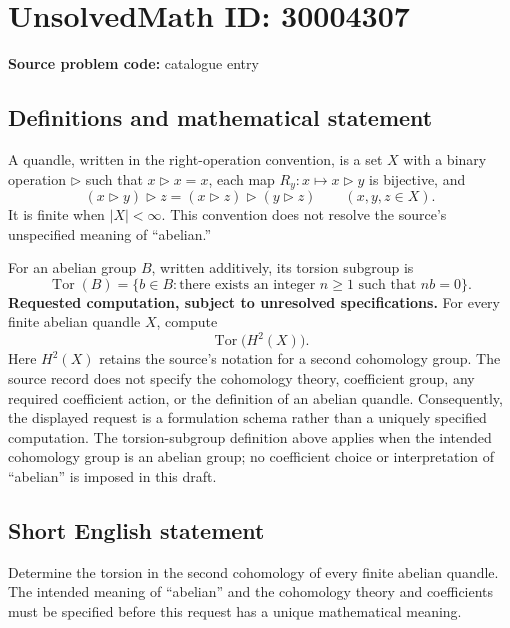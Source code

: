 \documentclass[11pt]{article}
\begin{document}
\section*{UnsolvedMath ID: 30004307}
\textbf{Source problem code:} catalogue entry
\subsection{Definitions and mathematical statement}
A quandle, written in the right-operation convention, is a set \(X\) with a binary operation \(\triangleright\) such that \(x\triangleright x=x\), each map \(R_y\colon x\mapsto x\triangleright y\) is bijective, and
\[
(x\triangleright y)\triangleright z=(x\triangleright z)\triangleright(y\triangleright z)
\qquad(x,y,z\in X).
\]
It is finite when \(|X|<\infty\). This convention does not resolve the source's unspecified meaning of ``abelian.''

For an abelian group \(B\), written additively, its torsion subgroup is
\[
\operatorname{Tor}(B)=\{b\in B:\text{there exists an integer }n\geq 1\text{ such that }nb=0\}.
\]
\textbf{Requested computation, subject to unresolved specifications.} For every finite abelian quandle \(X\), compute
\[
\operatorname{Tor}\bigl(H^2(X)\bigr).
\]
Here \(H^2(X)\) retains the source's notation for a second cohomology group. The source record does not specify the cohomology theory, coefficient group, any required coefficient action, or the definition of an abelian quandle. Consequently, the displayed request is a formulation schema rather than a uniquely specified computation. The torsion-subgroup definition above applies when the intended cohomology group is an abelian group; no coefficient choice or interpretation of ``abelian'' is imposed in this draft.
\subsection{Short English statement}
Determine the torsion in the second cohomology of every finite abelian quandle. The intended meaning of ``abelian'' and the cohomology theory and coefficients must be specified before this request has a unique mathematical meaning.
\end{document}
